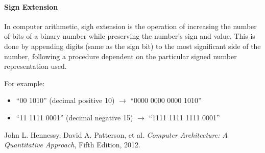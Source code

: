 \documentclass[12pt, a4paper]{article}
\theoremstyle{margin}
\begin{document}
      \paragraph{Sign Extension} In computer arithmetic, sigh extension is the operation of increasing the number of bits of a binary number while preserving the number's sign and value. This is done by appending digits (same as the sign bit) to the most significant side of the number, following a procedure dependent on the particular signed number representation used.
      
      For example:
        \begin{itemize}
          \item ``00 1010'' (decimal positive 10) $\rightarrow$ ``0000 0000 0000 1010''
          \item ``11 1111 0001'' (decimal negative 15) $\rightarrow$ ``1111 1111 1111 0001''
        \end{itemize}


\begin{thebibliography}{9}
    John L. Hennessy, David A. Patterson, et al.
    \emph{Computer Architecture: A Quantitative Approach},
    Fifth Edition, 2012. 
\end{thebibliography}
\end{document}
